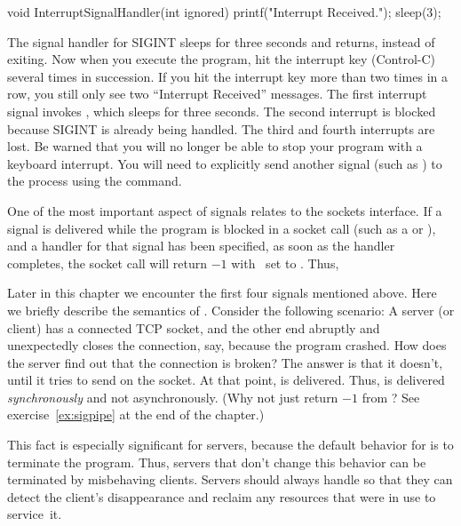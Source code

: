 \begin{inlinecode}
void InterruptSignalHandler(int ignored) {
      printf("Interrupt Received.\n");
      sleep(3);
}
\end{inlinecode}

\noindent The signal handler for SIGINT sleeps for three seconds and
returns, instead of exiting.  Now when you execute the program, hit the
interrupt key (Control-C) several times in succession.  If you
hit the interrupt key more than two times in a row,
you still only see two ``Interrupt Received'' messages.
The first interrupt signal invokes
, which sleeps
for three seconds.  The
second interrupt is blocked because SIGINT is already being handled.
The third and fourth interrupts are lost.  Be warned that you
will no longer be able to stop your program with a keyboard interrupt.  You
will need to explicitly send another signal (such as
) to the process using the 
command.

One of the most important aspect of signals relates to the
sockets interface.  If a signal is delivered while the program is
blocked in a socket call (such as a  or
), and a handler for that signal
has been specified, as soon as
the handler completes, the socket call will return $-1$ with
\ set to .
Thus, 

Later in this chapter we encounter the first four signals mentioned
above.  Here we briefly describe the semantics of
.
Consider the following scenario: A server (or client) has a connected
TCP socket, and the other end abruptly and
unexpectedly closes the connection, say,
because the  program crashed.   How does the server find out that the
connection is broken?  The answer is that it doesn't, until it tries
to send on the socket.  At that point,  is
delivered.  Thus,  is delivered
\emph{synchronously} and not asynchronously.
(Why not just return $-1$ from ?  See
exercise~\ref{ex:sigpipe} at the end of the chapter.)

This fact is especially significant for servers, because the default behavior
for  is to terminate the program.  Thus,
servers that don't change this behavior can be terminated by misbehaving
clients.  Servers should always handle  so
that they can detect the client's disappearance and reclaim any resources that
were in use to service~it.


